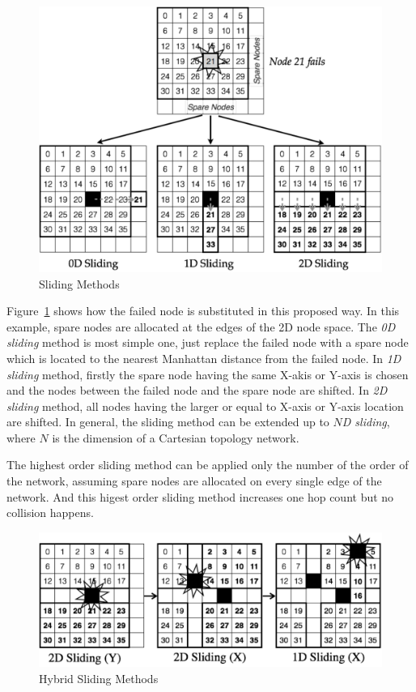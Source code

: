 \begin{figure}[ht]
\begin{center}
\includegraphics[width=0.95\columnwidth]{Figs/SlidingSubstitution.pdf}
  \caption{Sliding Methods}
  \label{fig:sliding-methods}
\end{center}
\end{figure}

Figure~\ref{fig:sliding-methods} shows how the failed node is
substituted in this proposed way. In this example, spare nodes are
allocated at the edges of the 2D node space. The {\em 0D sliding}
method is most simple one, just replace the failed node with a spare
node which is located to the nearest Manhattan distance from the
failed node. In {\em 1D sliding} method, firstly the spare node having
the same X-akis or Y-axis is chosen and the nodes between the failed
node and the spare node are shifted. In {\em 2D sliding} method, all
nodes having the larger or equal to X-axis or Y-axis location are
shifted. In general, the sliding method can be extended up to {\em
$N$D sliding}, where $N$ is the dimension of a Cartesian topology
network. 

The highest order sliding method can be applied only the number of the
order of the network, assuming spare nodes are allocated on every
single edge of the network. And this higest order sliding method
increases one hop count but no collision happens.

\begin{figure}[ht]
\begin{center}
\includegraphics[width=0.95\columnwidth]{Figs/HybridSliding.pdf}
  \caption{Hybrid Sliding Methods}
  \label{fig:hybrid-methods}
\end{center}
\end{figure}

